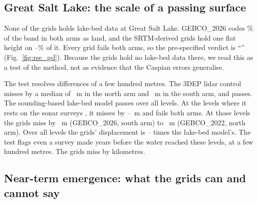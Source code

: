 \subsection{Great Salt Lake: the scale of a passing surface}
\label{sec:res_gsl}
None of the grids holds lake-bed data at Great Salt Lake. GEBCO\_2026 codes \% of the band in both arms as land, and the SRTM-derived grids hold one flat height on --\% of it. Every grid fails both arms, so the pre-specified verdict is ``'' (Fig.~\ref{fig:rse_gsl}). Because the grids hold no lake-bed data there, we read this as a test of the method, not as evidence that the Caspian errors generalise. 



The test resolves differences of a few hundred metres. The 3DEP lidar control misses by a median of ~m in the north arm and ~m in the south arm, and passes. The sounding-based lake-bed model \citep{tarboton_gsl_bathymetry} passes over all levels. At the levels where it rests on the sonar surveys \citep{baskin2005,baskin2006}, it misses by --~m and fails both arms. At those levels the grids miss by ~m (GEBCO\_2026, south arm) to ~m (GEBCO\_2022, north arm). Over all levels the grids' displacement is -- times the lake-bed model's. The test flags even a survey made years before the water reached these levels, at a few hundred metres. The grids miss by kilometres.

\subsection{Near-term emergence: what the grids can and cannot say}
\label{sec:res_nearterm}

